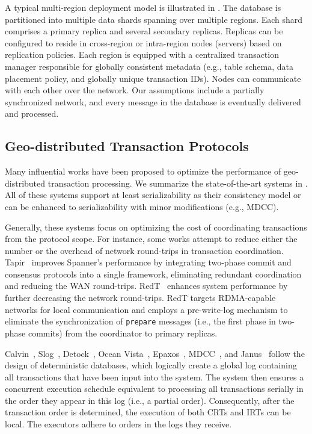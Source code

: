 A typical multi-region deployment model is illustrated in . The database is partitioned into multiple data shards spanning over multiple regions. Each shard comprises a primary replica and several secondary replicas. Replicas can be configured to reside in cross-region or intra-region nodes (servers) based on replication policies. Each region is equipped with a centralized transaction manager responsible for globally consistent metadata (e.g., table schema, data placement policy, and globally unique transaction IDs). Nodes can communicate with each other over the network. Our assumptions include a partially synchronized network, and every message in the database is eventually delivered and processed.

\subsection{Geo-distributed Transaction Protocols}\label{sec:background:geo}

Many influential works have been proposed to optimize the performance of geo-distributed transaction processing. We summarize the state-of-the-art systems in . All of these systems support at least serializability as their consistency model or can be enhanced to serializability with minor modifications (e.g., MDCC).

Generally, these systems focus on optimizing the cost of coordinating transactions from the protocol scope. For instance, some works attempt to reduce either the number or the overhead of network round-trips in transaction coordination. Tapir~\cite{tapir:tocs} improves Spanner's performance by integrating two-phase commit and consensus protocols into a single framework, eliminating redundant coordination and reducing the WAN round-trips. RedT~\cite{zhang2023redt} enhances system performance by further decreasing the network round-trips. RedT targets RDMA-capable networks for local communication and employs a pre-write-log mechanism to eliminate the synchronization of \texttt{prepare} messages (i.e., the first phase in two-phase commits) from the coordinator to primary replicas.


Calvin~\cite{calvin:sigmod12}, Slog~\cite{slog:vldb19}, Detock~\cite{nguyen2023detock}, Ocean Vista~\cite{ov:vldb19}, Epaxos~\cite{epaxos:sosp13}, MDCC~\cite{mdcc:eurosys13}, and Janus~\cite{janus:osdi16} follow the design of deterministic databases, which logically create a global log containing all transactions that have been input into the system. The system then ensures a concurrent execution schedule equivalent to processing all transactions serially in the order they appear in this log (i.e., a partial order). Consequently, after the transaction order is determined, the execution of both CRTs and IRTs can be local. The executors adhere to orders in the logs they receive.

